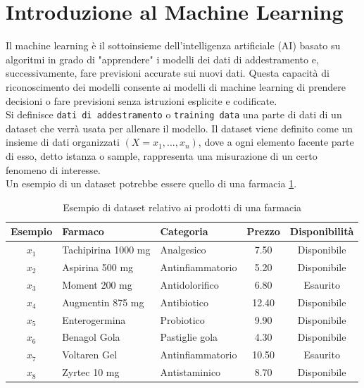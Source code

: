 \section{Introduzione al Machine Learning}
Il machine learning è il sottoinsieme dell'intelligenza artificiale (AI) basato su algoritmi in grado di "apprendere" i modelli dei dati di addestramento e, successivamente, fare previsioni accurate sui nuovi dati. 
Questa capacità di riconoscimento dei modelli consente ai modelli di machine learning di prendere decisioni o fare previsioni senza istruzioni esplicite e codificate.\\
Si definisce \texttt{dati di addestramento} o \texttt{training data} una parte di dati di un dataset che verrà usata per allenare il modello. Il dataset
viene definito come un insieme di dati organizzati $(X = x_1,..., x_n)$, dove a ogni elemento facente parte di esso, detto istanza o sample, rappresenta una misurazione
di un certo fenomeno di interesse.\\
Un esempio di un dataset potrebbe essere quello di una farmacia \ref{tab:dataset_farmacia}.
\begin{table}[h]
\centering
\begin{tabular}{|c|l|l|c|c|}
\hline
\textbf{Esempio} & Farmaco & Categoria & Prezzo & Disponibilità \\
\hline
$x_1$ & Tachipirina 1000 mg & Analgesico & 7.50 & Disponibile \\
$x_2$ & Aspirina 500 mg & Antinfiammatorio & 5.20 & Disponibile \\
$x_3$ & Moment 200 mg & Antidolorifico & 6.80 & Esaurito \\
$x_4$ & Augmentin 875 mg & Antibiotico & 12.40 & Disponibile \\
$x_5$ & Enterogermina & Probiotico & 9.90 & Disponibile \\
$x_6$ & Benagol Gola & Pastiglie gola & 4.30 & Disponibile \\
$x_7$ & Voltaren Gel & Antinfiammatorio & 10.50 & Esaurito \\
$x_8$ & Zyrtec 10 mg & Antistaminico & 8.70 & Disponibile \\
\hline
\end{tabular}
\caption{Esempio di dataset relativo ai prodotti di una farmacia}
\label{tab:dataset_farmacia}
\end{table}

